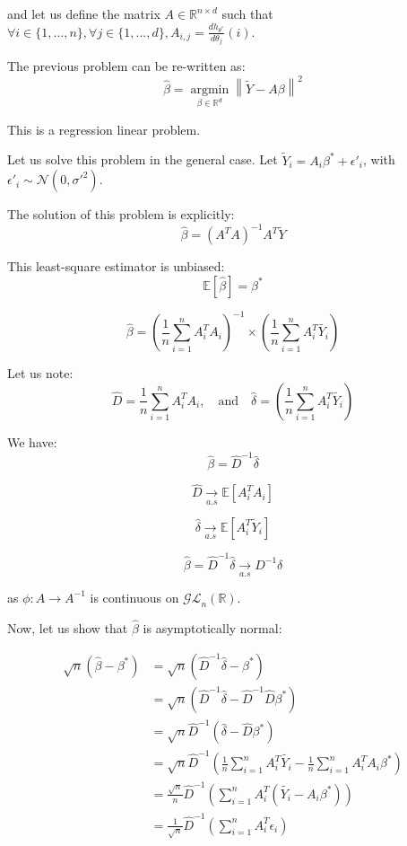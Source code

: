 \documentclass{article}
\begin{document}
and let us define the matrix $A \in \mathbb{R} ^{n \times d }$ such that $\forall i \in \{ 1, ..., n\}, \forall j \in \{1, ..., d\}, A_{i, j} = \frac{dh_{\theta^*}}{d\theta_j}(i)$.

The previous problem can be re-written as:
\[
\hat{\beta} =  \underset{\beta \in \mathbb{R}^d}{\operatorname{argmin}}  \left\lVert \tilde{Y} - A \beta \right\rVert ^2
\]

This is a regression linear problem.

Let us solve this problem in the general case. Let  $\tilde{Y}_i = A_i \beta ^* + \epsilon'_i $, with  $\epsilon'_i \sim \mathcal{N}(0, \sigma ' ^2)$.

The solution of this problem is explicitly:
\[
\hat{\beta } = (A^T A ) ^{-1} A^T \tilde{Y}
\]

This least-square estimator is unbiased:
\[
\mathbb{E}[\hat{\beta}] = \beta^*
\]

\[
\hat {\beta } = \left( \frac{1}{n} \sum_{i=1}^{n}   A_i ^T A_i \right) ^{-1}    \times \left( \frac{1}{n} \sum_{i=1}^{n} A_i ^T \tilde{Y_i } \right)
\]

Let us note:
\[
\hat{D}  = \frac{1}{n} \sum_{i=1}^{n}   A_i ^T A_i , \quad \text{and} \quad \hat{\delta}  = \left( \frac{1}{n} \sum_{i=1}^{n} A_i ^T \tilde{Y_i } \right)
\]

We have:
\[
\hat{\beta} = \hat{D} ^{-1} \hat{\delta}
\]

\[
\hat{D}  \underset{a.s}{\rightarrow}  \mathbb{E}[A_i ^T A_i ]
\]

\[
\hat{\delta}   \underset{a.s}{\rightarrow}  \mathbb{E}[A_i ^T \tilde{Y}_i ]
\]

\[
\hat{\beta} = \hat{D}^{-1} \hat{\delta}  \underset{a.s}{\rightarrow}  D^{-1} \delta
\]

as $\phi : A \rightarrow  A^{-1}$ is continuous on $\mathcal{GL}_n(\mathbb {R} )$.

Now, let us show that $\hat{\beta}$ is asymptotically normal: 

\begin{align*}
    \sqrt{n} ( \hat{\beta} - \beta ^* ) &= \sqrt{n} (\hat{D}^{-1} \hat{\delta} - \beta ^* ) \\
     &= \sqrt{n} (\hat{D}^{-1} \hat{\delta} - \hat{D}^{-1} \hat{D} \beta ^* ) \\
     &= \sqrt{n} \hat{D}^{-1} (\hat{\delta} -  \hat{D} \beta ^* )  \\
     &= \sqrt{n} \hat{D}^{-1} \left( \frac{1}{n} \sum_{i=1}^{n} A_i ^T \tilde{Y_i} - \frac{1}{n}  \sum_{i=1}^{n}  A_i ^T A_i \beta ^* \right)  \\
     &= \frac{\sqrt{n}}{n} \hat{D}^{-1} \left( \sum_{i=1}^{n} A_i ^T (\tilde{Y_i} -    A_i \beta ^* ) \right)   \\
     &= \frac{1}{\sqrt{n}}  \hat{D} ^{-1} \left( \sum_{i=1}^{n}  A_i ^T \epsilon _ i \right)  
\end{align*}
\end{document}
